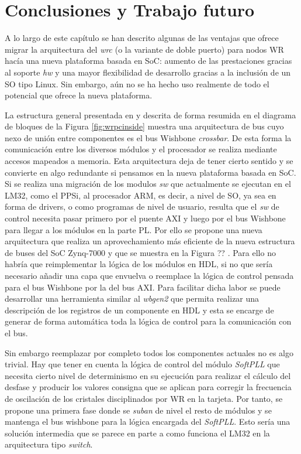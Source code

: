 \section{Conclusiones y Trabajo futuro} \label{sec:socfuturo}

A lo largo de este capítulo se han descrito algunas de las ventajas que ofrece 
migrar la arquitectura del \textit{wrc} (o la variante de doble puerto) para 
nodos WR hacía una nueva plataforma basada en SoC: aumento de las prestaciones 
gracias al soporte \textit{hw} y una mayor flexibilidad de desarrollo gracias a 
la inclusión de un SO tipo Linux. Sin embargo, aún no se ha hecho uso realmente 
de todo el potencial que ofrece la nueva plataforma.

La estructura general presentada en \cite{Daniluk2012} y descrita de forma 
resumida en el diagrama de bloques de la Figura \ref{fig:wrpcinside} muestra 
una arquitectura de bus cuyo nexo de unión entre componentes es el bus Wishbone 
\textit{crossbar}. De esta forma la comunicación entre los diversos módulos y 
el procesador se realiza mediante accesos mapeados a memoria. Esta arquitectura 
deja de tener cierto sentido y se convierte en algo redundante si pensamos en 
la nueva plataforma basada en SoC. Si se realiza una migración de los modulos 
\textit{sw} que actualmente se ejecutan en el LM32, como el PPSi, al procesador 
ARM, es decir, a nivel de SO, ya sea en forma de drivers, o como programas de 
nivel de usuario, resulta que el \textit{sw} de control  necesita pasar primero 
por el puente AXI y luego por el bus Wishbone para llegar a los módulos en la 
parte PL. Por ello se propone una nueva arquitectura que realiza un 
aprovechamiento más eficiente de la nueva estructura de buses del SoC Zynq-7000 
y que se muestra en la Figura ?? . Para ello no habría que reimplementar 
la lógica de los módulos en HDL, si no que sería necesario añadir una capa que 
envuelva o reemplace la lógica de control pensada para el bus Wishbone por la 
del bus AXI. Para facilitar dicha labor se puede desarrollar una herramienta 
similar al \textit{wbgen2} que permita realizar una descripción de los 
registros de un componente en HDL y esta se encarge de generar de forma 
automática toda la lógica de control para la comunicación con el bus.


Sin embargo reemplazar por completo todos los componentes actuales no es algo 
trivial. Hay que tener en cuenta la lógica de control del módulo 
\textit{SoftPLL} que necesita cierto nivel de determinismo en su ejecución para 
realizar el cálculo del desfase y producir los valores consigna que se aplican 
para corregir la frecuencia de oscilación de los cristales disciplinados por WR 
en la tarjeta. Por tanto, se propone una primera fase donde se \textit{suban} 
de nivel el resto de módulos y se mantenga el bus wishbone para la lógica 
encargada del \textit{SoftPLL}. Esto sería una solución intermedia que se 
parece en parte a como funciona el LM32 en la arquitectura tipo \textit{switch}.

